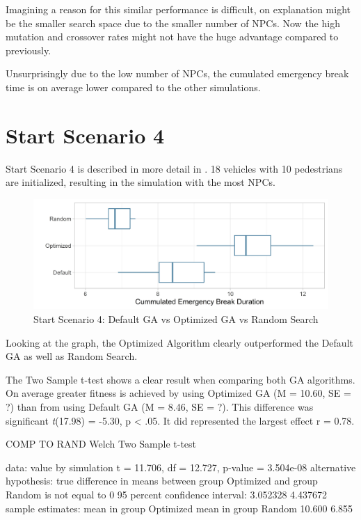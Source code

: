 Imagining a reason for this similar performance is difficult, on explanation might be the smaller search space due to the smaller number of NPCs. Now the high mutation and crossover rates might not have the huge advantage compared to previously.

Unsurprisingly due to the low number of NPCs, the cumulated emergency break time is on average lower compared to the other simulations.

\section{Start Scenario 4}
Start Scenario 4 is described in more detail in . 18 vehicles with 10 pedestrians are initialized, resulting in the simulation with the most NPCs.

\begin{figure}[ht] 
	\label{figure:sim_4_comparison}
	\includegraphics[width=1\linewidth]{simulations/evaluation/plots/sim_4_comparison}
	\caption{Start Scenario 4: Default GA vs Optimized GA vs Random Search}
\end{figure}

Looking at the graph, the Optimized Algorithm clearly outperformed the Default GA as well as Random Search.

The Two Sample t-test shows a clear result when comparing both GA algorithms. On average greater fitness is achieved by using Optimized GA (M = 10.60, SE = ?) than from using Default GA (M = 8.46, SE = ?). This difference was significant \textit{t}(17.98) = -5.30, p < .05. It did represented the largest effect r = 0.78.

COMP TO RAND
	Welch Two Sample t-test

data:  value by simulation
t = 11.706, df = 12.727, p-value = 3.504e-08
alternative hypothesis: true difference in means between group Optimized and group Random is not equal to 0
95 percent confidence interval:
3.052328 4.437672
sample estimates:
mean in group Optimized    mean in group Random 
10.600                   6.855 

